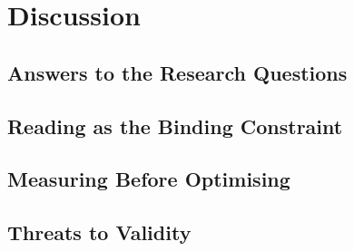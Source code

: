 \chapter{Discussion}
\label{ch:discussion}

\section{Answers to the Research Questions}
\label{sec:disc-rqs}

\section{Reading as the Binding Constraint}
\label{sec:disc-reading-constraint}

\section{Measuring Before Optimising}
\label{sec:disc-measurement}

\section{Threats to Validity}
\label{sec:disc-threats}
